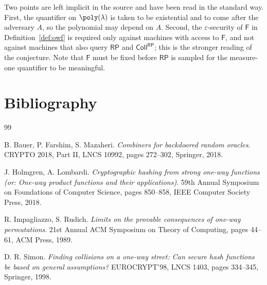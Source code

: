 \documentclass{conjura-conjecture}
\newcommand{\Fo}{\mathsf{F}}          %
\newcommand{\RP}{\mathsf{RP}}
\newcommand{\Coll}{\mathsf{Coll}}
\begin{document}
\begin{remark}\label{rem:readings}
Two points are left implicit in the source and have been read in the
standard way. First, the quantifier on $\poly(\lambda)$ is taken to be
existential and to come after the adversary $A$, so the polynomial may
depend on $A$. Second, the $\varepsilon$-security of $\Fo$ in
Definition~\ref{def:owf} is required only against machines with access to
$\Fo$, and not against machines that also query $\RP$ and $\Coll^{\RP}$;
this is the stronger reading of the conjecture. Note that $\Fo$ must be
fixed before $\RP$ is sampled for the measure-one quantifier to be
meaningful.
\end{remark}

\section{Bibliography}

\begin{conjurabibliography}{99}

B. Bauer, P. Farshim, S. Mazaheri.
\emph{Combiners for backdoored random oracles}.
CRYPTO 2018, Part II, LNCS 10992, pages 272--302, Springer, 2018.

J. Holmgren, A. Lombardi.
\emph{Cryptographic hashing from strong one-way functions (or: One-way
product functions and their applications)}.
59th Annual Symposium on Foundations of Computer Science, pages 850--858,
IEEE Computer Society Press, 2018.

R. Impagliazzo, S. Rudich.
\emph{Limits on the provable consequences of one-way permutations}.
21st Annual ACM Symposium on Theory of Computing, pages 44--61, ACM Press,
1989.

D. R. Simon.
\emph{Finding collisions on a one-way street: Can secure hash functions be
based on general assumptions?}
EUROCRYPT'98, LNCS 1403, pages 334--345, Springer, 1998.

\end{conjurabibliography}
\end{document}
